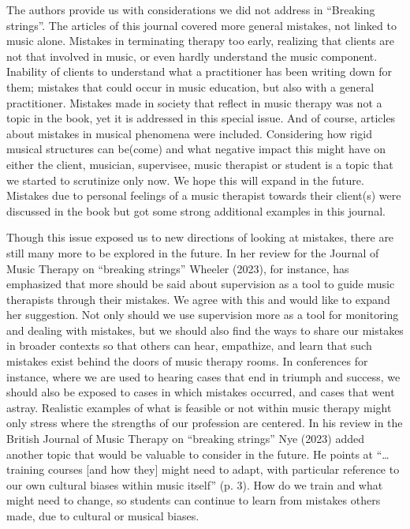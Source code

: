 \documentclass[authordate, empirical, issue]{jote-new-article}
\begin{document}
The authors provide us with considerations we did not address in “Breaking strings”. The articles of this journal covered more general mistakes, not linked to music alone. Mistakes in terminating therapy too early, realizing that clients are not that involved in music, or even hardly understand the music component. Inability of clients to understand what a practitioner has been writing down for them; mistakes that could occur in music education, but also with a general practitioner. Mistakes made in society that reflect in music therapy was not a topic in the book, yet it is addressed in this special issue. And of course, articles about mistakes in musical phenomena were included. Considering how rigid musical structures can be(come) and what negative impact this might have on either the client, musician, supervisee, music therapist or student is a topic that we started to scrutinize only now. We hope this will expand in the future. Mistakes due to personal feelings of a music therapist towards their client(s) were discussed in the book but got some strong additional examples in this journal.



Though this issue exposed us to new directions of looking at mistakes, there are still many more to be explored in the future. In her review for the Journal of Music Therapy on “breaking strings” Wheeler (2023), for instance, has emphasized that more should be said about supervision as a tool to guide music therapists through their mistakes. We agree with this and would like to expand her suggestion. Not only should we use supervision more as a tool for monitoring and dealing with mistakes, but we should also find the ways to share our mistakes in broader contexts so that others can hear, empathize, and learn that such mistakes exist behind the doors of music therapy rooms. In conferences for instance, where we are used to hearing cases that end in triumph and success, we should also be exposed to cases in which mistakes occurred, and cases that went astray. Realistic examples of what is feasible or not within music therapy might only stress where the strengths of our profession are centered. In his review in the British Journal of Music Therapy on “breaking strings” Nye (2023) added another topic that would be valuable to consider in the future. He points at “…training courses [and how they] might need to adapt, with particular reference to our own cultural biases within music itself” (p. 3). How do we train and what might need to change, so students can continue to learn from mistakes others made, due to cultural or musical biases.
\end{document}
